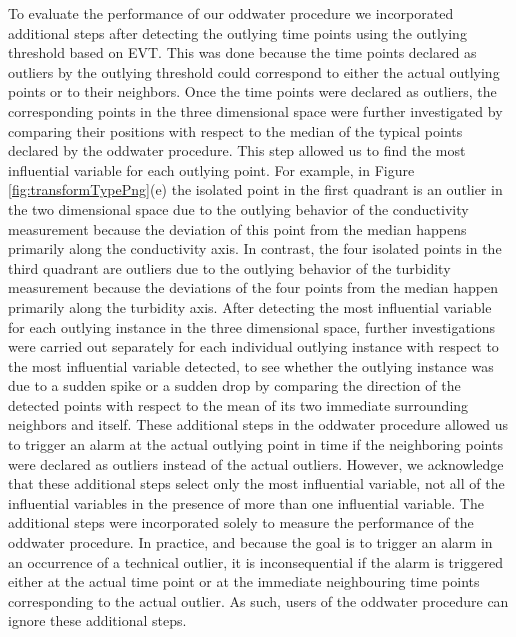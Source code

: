 \documentclass[draft]{agujournal2018} %
\begin{document}
To evaluate the performance of our \color{black} oddwater procedure \color{black} we incorporated additional steps after detecting the outlying time points using the
outlying threshold based on EVT. This was done because the time points
declared as outliers by the outlying threshold could correspond to
either the actual outlying points or to their neighbors. Once the time
points were declared as outliers, the corresponding points in the \color{black}  three \color{black} dimensional space were further investigated by comparing their positions
with respect to the median of the typical points declared by the
\color{black} oddwater procedure. \color{black} This step allowed us to find the most influential
variable for each outlying point. For example, in Figure
\ref{fig:transformTypePng}(e) the isolated point in the first quadrant
is an outlier in the two dimensional space due to the outlying behavior
of the conductivity measurement \color{black} because the deviation of this point from the median happens primarily along the conductivity axis. \color{black} In contrast, the four isolated points
in the third quadrant are outliers due to the outlying behavior of the
turbidity measurement \color{black} because the deviations of the four points from the median happen primarily along the turbidity axis. \color{black}  After detecting the most influential \color{black} variable \color{black}
for each outlying instance \color{black} in the three dimensional space, \color{black}  further investigations were carried out
separately for each individual outlying instance \color{black} with respect to the most influential variable detected,\color{black}  to see whether the
outlying instance was due to a sudden spike or a sudden drop by
comparing the direction of the detected points with respect to the mean
of its two immediate surrounding neighbors and itself. These additional
steps in the \color{black} oddwater procedure \color{black} allowed us to  \color{black} trigger an alarm at the actual outlying point in time \color{black} if the neighboring points were declared as outliers instead of the actual outliers. \color{black} However, we acknowledge that these additional steps select only the most influential variable, not all of the influential variables in the presence of more than one influential variable. The additional steps were incorporated solely to measure the performance of the oddwater procedure. In practice, and because the goal is to trigger an alarm in an occurrence of a technical outlier, it is inconsequential  if the alarm is triggered either at the actual time point or at the immediate neighbouring time points corresponding to the actual outlier. As such, users of the oddwater procedure can ignore these additional steps. \color{black}
\end{document}
